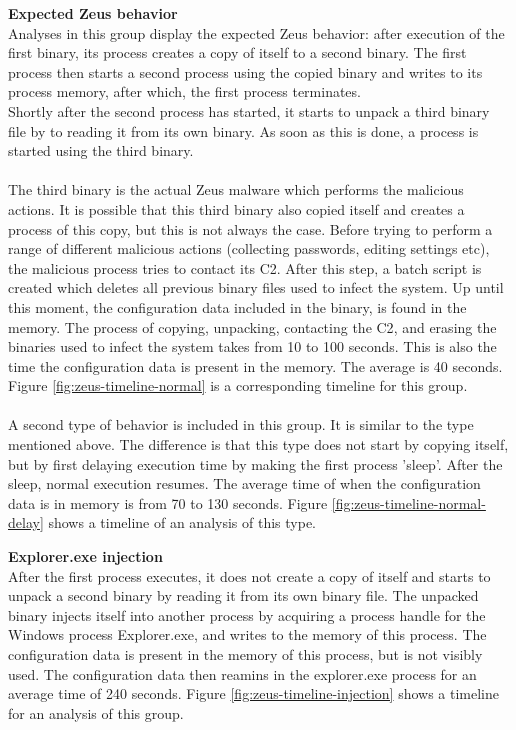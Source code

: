 \documentclass[conference]{IEEEtran}
\begin{document}
\textbf{Expected Zeus behavior}
\\Analyses in this group display the expected Zeus behavior: \cite{wyke-zeus} after execution of the first binary, its process creates a copy of itself to a second binary. The first process then starts a second process using the copied binary and writes to its process memory, after which, the first process terminates.\\ Shortly after the second process has started, it starts to unpack a third binary file by to reading it from its own binary. As soon as this is done, a process is started using the third binary.
\\\\The third binary is the actual Zeus malware which performs the \Gls{malicious actions}. It is possible that this third binary also copied itself and creates a process of this copy, but this is not always the case. Before trying to perform a range of different \Gls{malicious actions} (collecting passwords, editing settings etc), the malicious process tries to contact its \Gls{C2}. After this step, a batch script is created which deletes all previous binary files used to infect the system. Up until this moment, the \Gls{configuration data} included in the binary, is found in the memory. The process of copying, unpacking, contacting the \Gls{C2}, and erasing the binaries used to infect the system takes from 10 to 100 seconds. This is also the time the \Gls{configuration data} is present in the memory. The average is 40 seconds.  Figure \ref{fig:zeus-timeline-normal} is a corresponding timeline for this group. \\\\A second type of behavior is included in this group. It is similar to the type mentioned above. The difference is that this type does not start by copying itself, but by first delaying execution time by making the first process 'sleep'. After the sleep, normal execution resumes. The average time of when the \Gls{configuration data} is in memory is from 70 to 130 seconds. Figure \ref{fig:zeus-timeline-normal-delay} shows a timeline of an analysis of this type.


\newpage

\textbf{Explorer.exe injection}
\\After the first process executes, it does not create a copy of itself and starts to unpack a second binary by reading it from its own binary file. The unpacked binary injects itself into another process by acquiring a process handle for the Windows process Explorer.exe, and writes to the memory of this process. The \Gls{configuration data} is present in the memory of this process, but is not visibly used. The \Gls{configuration data} then reamins in the explorer.exe process for an average time of 240 seconds. Figure \ref{fig:zeus-timeline-injection} shows a timeline for an analysis of this group.\\
\end{document}
